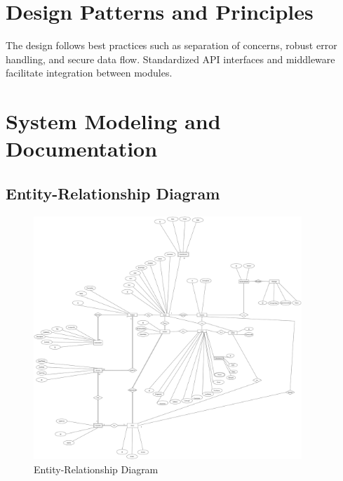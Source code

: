 \documentclass[12pt,a4paper]{report}
\begin{document}
\section{Design Patterns and Principles}
The design follows best practices such as separation of concerns, robust error handling, and secure data flow. Standardized API interfaces and middleware facilitate integration between modules.

\section{System Modeling and Documentation}
\subsection{Entity-Relationship Diagram}
\begin{figure}[htbp]
    \centering
    \includegraphics[width=0.9\textwidth]{er-diagram.png}
    \caption{Entity-Relationship Diagram}
    \label{fig:er-diagram}
\end{figure}
\end{document}
